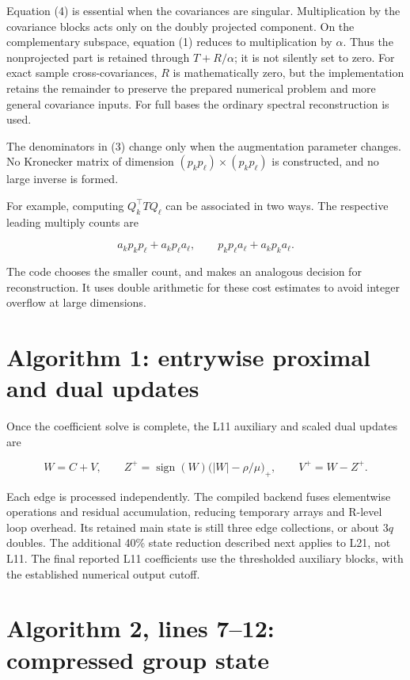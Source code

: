 \documentclass[
  11pt,
]{article}
\begin{document}
Equation (4) is essential when the covariances are singular.
Multiplication by the covariance blocks acts only on the doubly
projected component. On the complementary subspace, equation (1) reduces
to multiplication by \(\alpha\). Thus the nonprojected part is retained
through \(T+R/\alpha\); it is not silently set to zero. For exact sample
cross-covariances, \(R\) is mathematically zero, but the implementation
retains the remainder to preserve the prepared numerical problem and
more general covariance inputs. For full bases the ordinary spectral
reconstruction is used.

The denominators in (3) change only when the augmentation parameter
changes. No Kronecker matrix of dimension
\((p_kp_\ell)\times(p_kp_\ell)\) is constructed, and no large inverse is
formed.

For example, computing \(Q_k^\top TQ_\ell\) can be associated in two
ways. The respective leading multiply counts are

\[
a_kp_kp_\ell+a_kp_\ell a_\ell,
\qquad
p_kp_\ell a_\ell+a_kp_ka_\ell.
\]

The code chooses the smaller count, and makes an analogous decision for
reconstruction. It uses double arithmetic for these cost estimates to
avoid integer overflow at large dimensions.

\hypertarget{algorithm-1-entrywise-proximal-and-dual-updates}{%
\section{Algorithm 1: entrywise proximal and dual
updates}\label{algorithm-1-entrywise-proximal-and-dual-updates}}

Once the coefficient solve is complete, the L11 auxiliary and scaled
dual updates are

\[
W=C+V,\qquad
Z^{+}=\operatorname{sign}(W)\bigl(|W|-\rho/\mu\bigr)_+,
\qquad V^{+}=W-Z^{+}.
\]

Each edge is processed independently. The compiled backend fuses
elementwise operations and residual accumulation, reducing temporary
arrays and R-level loop overhead. Its retained main state is still three
edge collections, or about \(3q\) doubles. The additional 40\% state
reduction described next applies to L21, not L11. The final reported L11
coefficients use the thresholded auxiliary blocks, with the established
numerical output cutoff.

\hypertarget{algorithm-2-lines-712-compressed-group-state}{%
\section{Algorithm 2, lines 7--12: compressed group
state}\label{algorithm-2-lines-712-compressed-group-state}}
\end{document}
